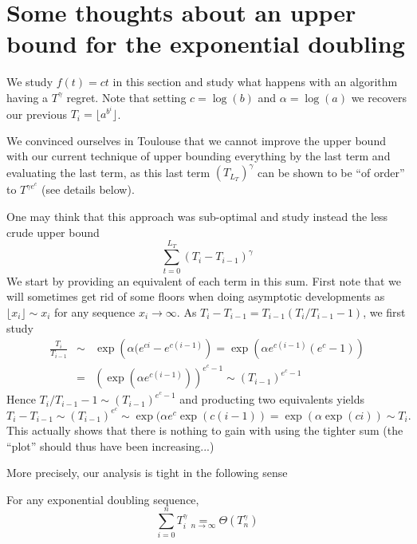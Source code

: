 \documentclass[12pt]{colt2018} %
\begin{document}
\hr{}

\section{Some thoughts about an upper bound for the exponential doubling}\label{appendix:equivalence_Ti_and_TimTim1}

We study $f(t) = c t$ in this section and study what happens with an algorithm having a $T^{\gamma}$ regret. Note that setting $c=\log (b)$ and $\alpha = \log(a)$ we recovers our previous $T_i  = \lfloor a^{b^i}\rfloor$.

We convinced ourselves in Toulouse that we cannot improve the upper bound with our current technique of upper bounding everything by the last term and evaluating the last term, as this last term $(T_{L_T})^{\gamma}$ can be shown to be ``of order'' to $T^{\gamma e^c}$ (see details below).

One may think that this approach was sub-optimal and study instead the less crude upper bound
\[\sum_{t=0}^{L_T} (T_{i} - T_{i-1})^{\gamma}\]
We start by providing an equivalent of each term in this sum. First note that we will sometimes get rid of some floors when doing asymptotic developments as $\lfloor x_i \rfloor \sim x_i$ for any sequence $x_i \rightarrow \infty$. As $T_i - T_{i-1}  =  T_{i-1}\left(T_i/T_{i-1} - 1 \right) $, we first study
\begin{eqnarray*}
\frac{T_i}{T_{i-1}} & \sim & \exp\left(\alpha (e^{ci} - e^{c(i-1)}\right) = \exp\left(\alpha e^{c(i-1)}(e^c - 1)\right) \\
& = & \left(\exp\left(\alpha e^{c(i-1)}\right)\right)^{e^c -1} \sim (T_{i-1})^{e^c-1}
\end{eqnarray*}
Hence $T_{i}/T_{i-1} - 1 \sim (T_{i-1})^{e^{c}-1}$ and producting two equivalents yields
\[T_{i} - T_{i-1} \sim (T_{i-1})^{e^c} \sim \exp(\alpha e^c \exp(c(i-1)) = \exp(\alpha \exp(ci)) \sim T_i.\]
This actually shows that there is nothing to gain with using the tighter sum (the ``plot'' should thus have been increasing...)

More precisely, our analysis is tight in the following sense

\begin{lemma} For any exponential doubling sequence,
\[\sum_{i=0}^{n}T_i^{\gamma} \underset{n \rightarrow \infty}{=} \Theta(T_n^{\gamma})\]
\end{lemma}

\end{document}
